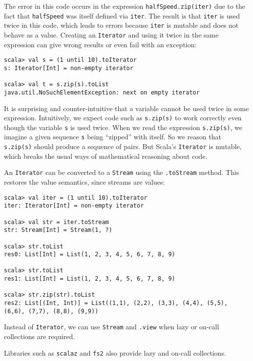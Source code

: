 The error in this code occurs in the expression \lstinline!halfSpeed.zip(iter)!
due to the fact that \lstinline!halfSpeed! was itself defined via
\lstinline!iter!. The result is that \lstinline!iter! is used twice
in this code, which leads to errors because \lstinline!iter! is mutable
and does not behave as a value. Creating an \lstinline!Iterator!
and using it twice in the same expression can give wrong results or
even fail with an exception:
\begin{lstlisting}
scala> val s = (1 until 10).toIterator
s: Iterator[Int] = non-empty iterator

scala> val t = s.zip(s).toList
java.util.NoSuchElementException: next on empty iterator
\end{lstlisting}
It is surprising and counter-intuitive that a variable cannot be used
twice in some expression. Intuitively, we expect code such as \lstinline!s.zip(s)!
to work correctly even though the variable \lstinline!s! is used
twice. When we read the expression \lstinline!s.zip(s)!, we imagine
a given sequence \lstinline!s! being ``zipped'' with itself. So
we reason that \lstinline!s.zip(s)! should produce a sequence of
pairs. But Scala's \lstinline!Iterator! is mutable, which breaks
the usual ways of mathematical reasoning about code.

An \lstinline!Iterator! can be converted to a \lstinline!Stream!
using the \lstinline!.toStream! method. This restores the value semantics,
since streams are values:
\begin{lstlisting}
scala> val iter = (1 until 10).toIterator
iter: Iterator[Int] = non-empty iterator

scala> val str = iter.toStream
str: Stream[Int] = Stream(1, ?)

scala> str.toList
res0: List[Int] = List(1, 2, 3, 4, 5, 6, 7, 8, 9)

scala> str.toList
res1: List[Int] = List(1, 2, 3, 4, 5, 6, 7, 8, 9)

scala> str.zip(str).toList
res2: List[(Int, Int)] = List((1,1), (2,2), (3,3), (4,4), (5,5), (6,6), (7,7), (8,8), (9,9)) 
\end{lstlisting}
Instead of \lstinline!Iterator!, we can use \lstinline!Stream! and
\lstinline!.view! when lazy or on-call collections are required.

Libraries such as \lstinline!scalaz! and \lstinline!fs2! also provide
lazy and on-call collections.
